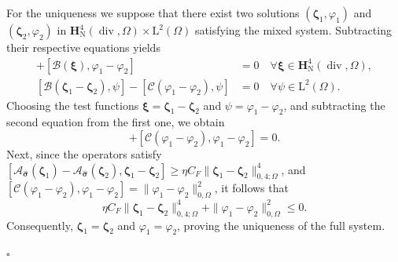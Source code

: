 \documentclass[fleqn,a4paper]{cas-sc}
\newcommand\vdiv{\mathop{\mathrm{div}}\nolimits}
\newcommand{\bxi}{\boldsymbol{\xi}}
\newcommand{\bzeta}{\boldsymbol{\zeta}}
\newcommand{\0}{\boldsymbol{0}}
\newcommand\cC{\mathcal{C}}
\newcommand\bH{\mathbf{H}}
\newcommand\rL{\mathrm{L}}
\newcommand\bsigma{\boldsymbol{\sigma}}
\numberwithin{equation}{section}
\numberwithin{figure}{section}
\newenvironment{proof}{\noindent{\it Proof.}}{\hfill$\square$}
\begin{document}
\begin{proof}
    For the uniqueness we suppose that there exist two solutions $(\bzeta_1, \varphi_1)$ and $(\bzeta_2, \varphi_2)$ in $\bH^{4}_{\mathrm{N}}(\vdiv,\Omega) \times \rL^2(\Omega)$ satisfying the mixed system. Subtracting their respective equations yields
    \begin{align*}
        [\mathcal{A}_{\widehat{\bsigma}}(\bzeta_1) - \mathcal{A}_{\widehat{\bsigma}}(\bzeta_2), \bxi] + [\mathcal{B}(\bxi), \varphi_1 - \varphi_2] &= 0 \quad \forall \bxi \in \bH^{4}_{\mathrm{N}}(\vdiv,\Omega),\\ 
        [\mathcal{B}(\bzeta_1 - \bzeta_2), \psi] - [\cC(\varphi_1 - \varphi_2), \psi] &= 0 \quad \forall \psi \in \rL^2(\Omega). %
    \end{align*}
    Choosing the test functions $\bxi = \bzeta_1 - \bzeta_2$ and $\psi = \varphi_1 - \varphi_2$, and  subtracting the second equation from the first one,  we obtain
    \begin{equation*}
        [\mathcal{A}_{\widehat{\bsigma}}(\bzeta_1) - \mathcal{A}_{\widehat{\bsigma}}(\bzeta_2), \bzeta_1 - \bzeta_2] + [\cC(\varphi_1 - \varphi_2), \varphi_1 - \varphi_2] = 0.
    \end{equation*}
    Next, since the operators satisfy $[\mathcal{A}_{\widehat{\bsigma}}(\bzeta_1) - \mathcal{A}_{\widehat{\bsigma}}(\bzeta_2), \bzeta_1 - \bzeta_2] \ge \eta C_F \|\bzeta_1 - \bzeta_2\|_{0,4;\Omega}^4$, and $[\cC(\varphi_1 - \varphi_2), \varphi_1 - \varphi_2] = \|\varphi_1 - \varphi_2\|_{0,\Omega}^2$, it follows that
    \begin{equation*}
        \eta C_F \|\bzeta_1 - \bzeta_2\|_{0,4;\Omega}^4 + \|\varphi_1 - \varphi_2\|_{0,\Omega}^2 \le 0.
    \end{equation*}
 Consequently, $\bzeta_1 = \bzeta_2$ and $\varphi_1 = \varphi_2$, proving the uniqueness of the full system.
 

\end{proof}
\end{document}
